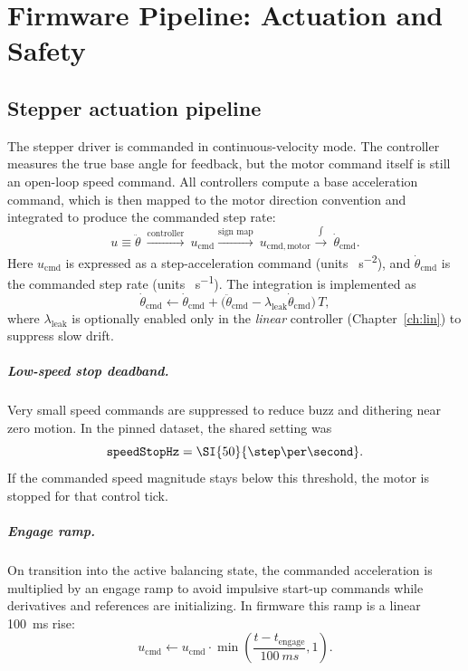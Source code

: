 \chapter{Firmware Pipeline: Actuation and Safety}
\label{ch:actuation}

\section{Stepper actuation pipeline}
The stepper driver is commanded in continuous-velocity mode. The controller measures the true base angle for feedback, but the motor command itself is still an open-loop speed command. All controllers compute a base acceleration command, which is then mapped to the motor direction convention and integrated to produce the commanded step rate:
\[
u \equiv \ddot{\theta}\ \xrightarrow{\text{controller}}\ u_{\mathrm{cmd}}
\xrightarrow{\text{sign map}}\ u_{\mathrm{cmd,motor}}
\xrightarrow{\int}\ \dot{\theta}_{\mathrm{cmd}}.
\]
Here $u_{\mathrm{cmd}}$ is expressed as a step-acceleration command (units \si{\step\per\second\squared}), and $\dot{\theta}_{\mathrm{cmd}}$ is the commanded step rate (units \si{\step\per\second}).
The integration is implemented as
\[
\dot{\theta}_{\mathrm{cmd}} \leftarrow \dot{\theta}_{\mathrm{cmd}} + \bigl(\ddot{\theta}_{\mathrm{cmd}} - \lambda_{\mathrm{leak}}\dot{\theta}_{\mathrm{cmd}}\bigr)\,T,
\]
where $\lambda_{\mathrm{leak}}$ is optionally enabled only in the \emph{linear} controller (Chapter~\ref{ch:lin}) to suppress slow drift.

\paragraph{Low-speed stop deadband.}
Very small speed commands are suppressed to reduce buzz and dithering near zero motion. In the pinned dataset, the shared setting was
\[
\texttt{speedStopHz} = \SI{50}{\step\per\second}.
\]
If the commanded speed magnitude stays below this threshold, the motor is stopped for that control tick.

\paragraph{Engage ramp.}
On transition into the active balancing state, the commanded acceleration is multiplied by an engage ramp to avoid impulsive start-up commands while derivatives and references are initializing. In firmware this ramp is a linear \SI{100}{ms} rise:
\[
u_{\mathrm{cmd}} \leftarrow u_{\mathrm{cmd}}\cdot \min\!\left(\frac{t-t_{\mathrm{engage}}}{\SI{100}{ms}},1\right).
\]

